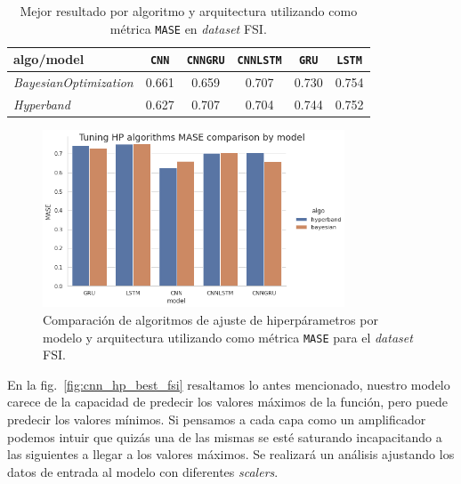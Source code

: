 \documentclass[a4paper,12pt]{article}
\begin{document}
\begin{table}[H]
\centering
\begin{tabular}{l|ccccc}
\hline
algo/model & \texttt{CNN} & \texttt{CNNGRU} & \texttt{CNNLSTM} & \texttt{GRU} & \texttt{LSTM} \\ \hline
\textit{BayesianOptimization}         & 0.661        & 0.659           &    0.707         &     0.730    & 0.754         \\
\textit{Hyperband}         & 0.627        & 0.707           & 0.704            & 0.744        & 0.752         \\ \hline
\end{tabular}
\caption{Mejor resultado por algoritmo y arquitectura utilizando como métrica \texttt{MASE} en \textit{dataset} FSI.}
\label{tab:algo_vs_arch_mase_fsi}
\end{table}

\begin{figure}[H]
	\begin{center}
	\includegraphics[width=0.8\textwidth]{model_vs_algo_hp_mase_fsi.png}
  	\caption{Comparación de algoritmos de ajuste de hiperpárametros por modelo y arquitectura utilizando como métrica \texttt{MASE} para el \textit{dataset} FSI.}
  	\label{fig:algo_comparison_mase_fsi}
  	\end{center}
\end{figure}

En la fig.~\ref{fig:cnn_hp_best_fsi} resaltamos lo antes mencionado, nuestro modelo carece de la capacidad de predecir los valores máximos de la función, pero puede predecir los valores mínimos. Si pensamos a cada capa como un amplificador podemos intuir que quizás una de las mismas se esté saturando incapacitando a las siguientes a llegar a los valores máximos. Se realizará un análisis ajustando los datos de entrada al modelo con diferentes \textit{scalers}. %
\end{document}
